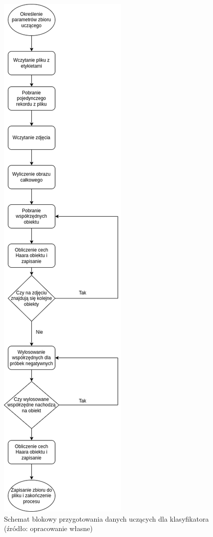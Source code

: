 \begin{figure}[!ht]
    \centering
    \includegraphics[scale=0.4]{Pictures/prepare_haar_dataset}
    \caption{Schemat blokowy przygotowania danych uczących dla klasyfikatora (źródło: opracowanie własne)}
    \label{fig:haar_feats_dataset_prepare}
\end{figure}
